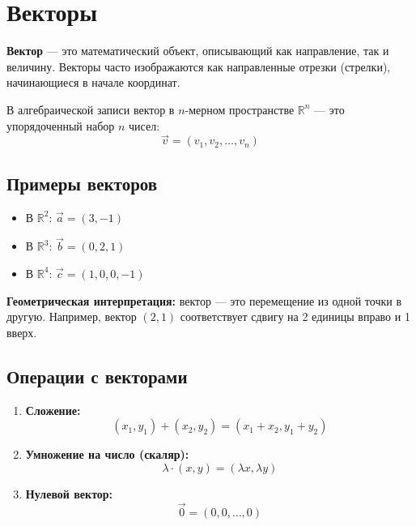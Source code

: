 \section{Векторы}

\textbf{Вектор} — это математический объект, описывающий как направление, так и величину. Векторы часто изображаются как направленные отрезки (стрелки), начинающиеся в начале координат.

В алгебраической записи вектор в $n$-мерном пространстве $\mathbb{R}^n$ — это упорядоченный набор $n$ чисел:
\[
\vec{v} = (v_1, v_2, \dots, v_n)
\]

\subsection*{Примеры векторов}
\begin{itemize}
  \item В $\mathbb{R}^2$: $\vec{a} = (3, -1)$
  \item В $\mathbb{R}^3$: $\vec{b} = (0, 2, 1)$
  \item В $\mathbb{R}^4$: $\vec{c} = (1, 0, 0, -1)$
\end{itemize}

\vspace{1em}
\textbf{Геометрическая интерпретация:} вектор — это перемещение из одной точки в другую. Например, вектор $(2, 1)$ соответствует сдвигу на 2 единицы вправо и 1 вверх.

\vspace{1em}
\begin{center}
\end{center}

\subsection*{Операции с векторами}

\begin{enumerate}
  \item \textbf{Сложение:}
  \[
  (x_1, y_1) + (x_2, y_2) = (x_1 + x_2, y_1 + y_2)
  \]
  \item \textbf{Умножение на число (скаляр):}
  \[
  \lambda \cdot (x, y) = (\lambda x, \lambda y)
  \]
  \item \textbf{Нулевой вектор:}
  \[
  \vec{0} = (0, 0, \dots, 0)
  \]
\end{enumerate}

